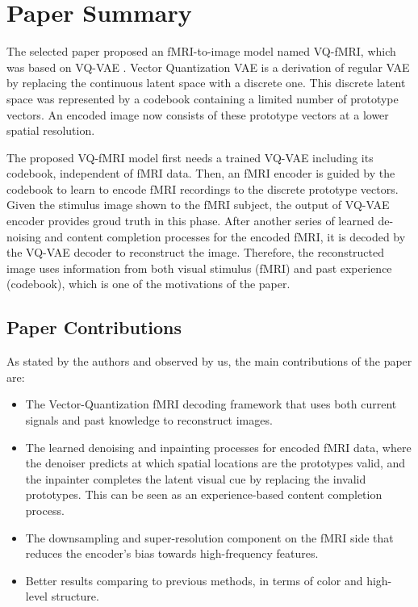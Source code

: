 \documentclass{article}
\theoremstyle{plain}
\theoremstyle{definition}
\theoremstyle{remark}
\begin{document}
\section{Paper Summary}
\label{submission}

The selected paper proposed an fMRI-to-image model named VQ-fMRI, which was based on VQ-VAE \cite{oordNeuralDiscreteRepresentation2018}. Vector Quantization VAE is a derivation of regular VAE by replacing the continuous latent space with a discrete one. This discrete latent space was represented by a codebook containing a limited number of prototype vectors. An encoded image now consists of these prototype vectors at a lower spatial resolution.

The proposed VQ-fMRI model first needs a trained VQ-VAE including its codebook, independent of fMRI data. Then, an fMRI encoder is guided by the codebook to learn to encode fMRI recordings to the discrete prototype vectors. Given the stimulus image shown to the fMRI subject, the output of VQ-VAE encoder provides groud truth in this phase. After another series of learned de-noising and content completion processes for the encoded fMRI, it is decoded by the VQ-VAE decoder to reconstruct the image. Therefore, the reconstructed image uses information from both visual stimulus (fMRI) and past experience (codebook), which is one of the motivations of the paper.


\subsection{Paper Contributions}
As stated by the authors and observed by us, the main contributions of the paper are:
\begin{itemize}
\item The Vector-Quantization fMRI decoding framework that uses both current signals and past knowledge to reconstruct images.
\item The learned denoising and inpainting processes for encoded fMRI data, where the denoiser predicts at which spatial locations are the prototypes valid, and the inpainter completes the latent visual cue by replacing the invalid prototypes. This can be seen as an experience-based content completion  process.
\item The downsampling and super-resolution component on the fMRI side that reduces the encoder's bias towards high-frequency features.
\item Better results comparing to previous methods, in terms of color and high-level structure.
\end{itemize}
\end{document}
